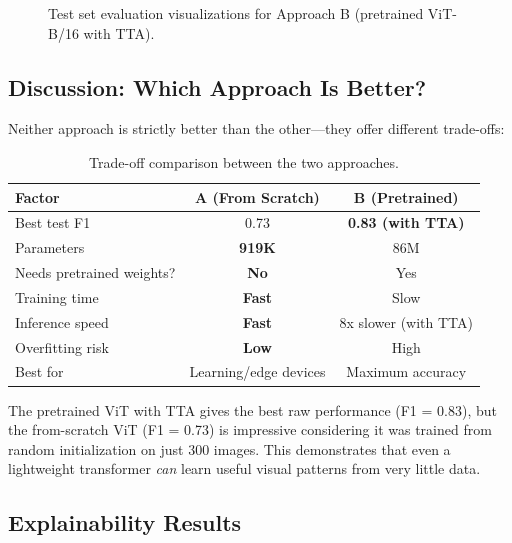\documentclass[10pt,twocolumn,letterpaper]{article}
\begin{document}
\begin{figure}[h]
\centering
{}
\caption{Test set evaluation visualizations for Approach B (pretrained ViT-B/16 with TTA).}
\label{fig:evaluation}
\end{figure}


\subsection{Discussion: Which Approach Is Better?}

Neither approach is strictly better than the other---they offer different trade-offs:

\begin{table}[h]
\centering
\caption{Trade-off comparison between the two approaches.}
\label{tab:tradeoff}
\small
\begin{tabular}{lcc}
\toprule
\textbf{Factor} & \textbf{A (From Scratch)} & \textbf{B (Pretrained)} \\
\midrule
Best test F1 & 0.73 & \textbf{0.83 (with TTA)} \\
Parameters & \textbf{919K} & 86M \\
Needs pretrained weights? & \textbf{No} & Yes \\
Training time & \textbf{Fast} & Slow \\
Inference speed & \textbf{Fast} & 8x slower (with TTA) \\
Overfitting risk & \textbf{Low} & High \\
Best for & Learning/edge devices & Maximum accuracy \\
\bottomrule
\end{tabular}
\end{table}

The pretrained ViT with TTA gives the best raw performance (F1 = 0.83), but the from-scratch ViT (F1 = 0.73) is impressive considering it was trained from random initialization on just 300 images. This demonstrates that even a lightweight transformer \textit{can} learn useful visual patterns from very little data.


\subsection{Explainability Results}
\end{document}
